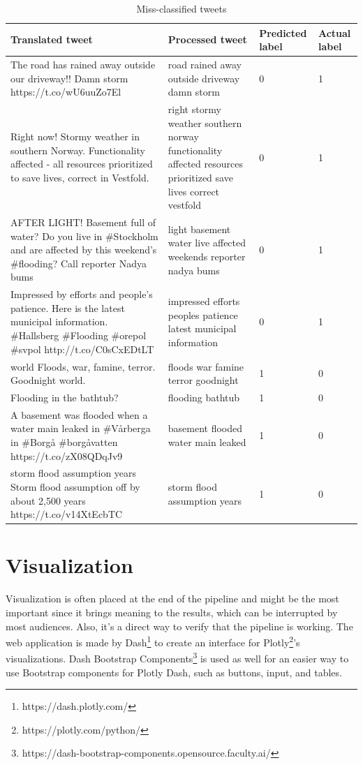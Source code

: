 \begin{table}
      \center
      \begin{tabular}{|p{5cm}|p{5cm}|l|l|}
    \hline
    Translated tweet & Processed tweet & Predicted label & Actual label\\
    \hline
    The road has rained away outside our driveway!! Damn storm https://t.co/wU6uuZo7El &
    road rained away outside driveway damn storm & 0 & 1 \\
    \hline
 Right now! Stormy weather in southern Norway. Functionality affected - all resources prioritized to save lives, correct in Vestfold. &
 right stormy weather southern norway functionality affected resources prioritized save lives correct vestfold & 0 & 1\\
    \hline
 AFTER LIGHT! Basement full of water? Do you live in \#Stockholm and are affected by this weekend's
 \#flooding? Call reporter Nadya bums &
 light basement water live affected weekends reporter nadya bums & 0 & 1\\
    \hline
 Impressed by efforts and people's patience. Here is the latest municipal information. \#Hallsberg
 \#Flooding \#orepol \#svpol http://t.co/C0sCxEDtLT &
 impressed efforts peoples patience latest municipal information & 0 & 1 \\
    \hline
     world Floods, war, famine, terror. Goodnight world. & 
 floods war famine terror goodnight & 1 & 0 \\
    \hline
     Flooding in the bathtub? & 
 flooding bathtub & 1 & 0 \\
    \hline
 A basement was flooded when a water main leaked in \#Vårberga in \#Borgå \#borgåvatten https://t.co/zX08QDqJv9 & 
 basement flooded water main leaked & 1 & 0 \\
    \hline
 storm flood assumption years Storm flood assumption off by about 2,500 years https://t.co/v14XtEcbTC & 
 storm flood assumption years & 1 & 0 \\
    \hline
  \end{tabular}
      \caption{Miss-classified tweets}
      \label{tab:tweets_missclassified}
  \end{table}


\section{Visualization}
 Visualization is often placed at the end of the pipeline and might be the most important since it
brings meaning to the results, which can be interrupted by most audiences. Also, it's a direct way
to verify that the pipeline is working. The web application is made by
Dash\footnote{https://dash.plotly.com/} to create an interface for
Plotly\footnote{https://plotly.com/python/}'s visualizations. Dash Bootstrap
Components\footnote{https://dash-bootstrap-components.opensource.faculty.ai/} is used as well for
an easier way to use Bootstrap components for Plotly Dash, such as buttons, input, and tables.


